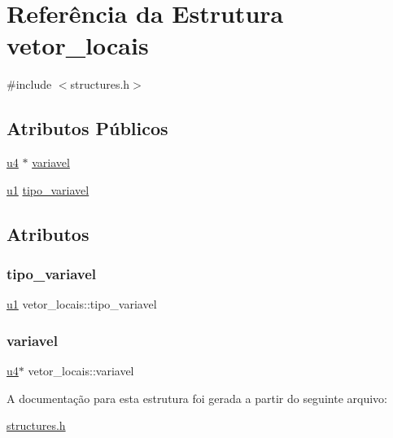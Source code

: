 \hypertarget{structvetor__locais}{}\section{Referência da Estrutura vetor\+\_\+locais}
\label{structvetor__locais}


{\ttfamily \#include $<$structures.\+h$>$}

\subsection*{Atributos Públicos}
\begin{DoxyCompactItemize}
\item 
\hyperlink{lista__operandos_8h_ae5be1f726785414dd1b77d60df074c9d}{u4} $\ast$ \hyperlink{structvetor__locais_a474212032f52e10c83331da9efdbf0e8}{variavel}
\item 
\hyperlink{lista__operandos_8h_ad9f4cdb6757615aae2fad89dab3c5470}{u1} \hyperlink{structvetor__locais_a8f30386b3b7757677d00d6e14e535278}{tipo\+\_\+variavel}
\end{DoxyCompactItemize}


\subsection{Atributos}
\mbox{\label{structvetor__locais_a8f30386b3b7757677d00d6e14e535278}} 
\subsubsection{\texorpdfstring{tipo\+\_\+variavel}{tipo\_variavel}}
{\footnotesize\ttfamily \hyperlink{lista__operandos_8h_ad9f4cdb6757615aae2fad89dab3c5470}{u1} vetor\+\_\+locais\+::tipo\+\_\+variavel}

\mbox{\label{structvetor__locais_a474212032f52e10c83331da9efdbf0e8}} 
\subsubsection{\texorpdfstring{variavel}{variavel}}
{\footnotesize\ttfamily \hyperlink{lista__operandos_8h_ae5be1f726785414dd1b77d60df074c9d}{u4}$\ast$ vetor\+\_\+locais\+::variavel}



A documentação para esta estrutura foi gerada a partir do seguinte arquivo\+:\begin{DoxyCompactItemize}
\item 
\hyperlink{structures_8h}{structures.\+h}\end{DoxyCompactItemize}
